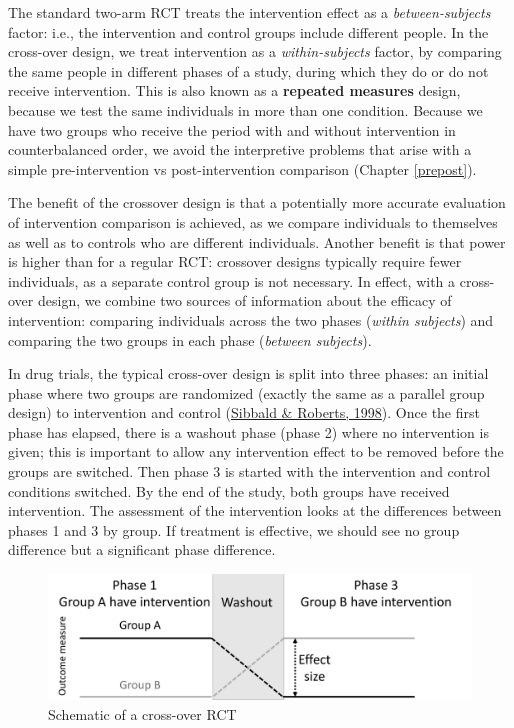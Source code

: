 \documentclass{krantz}
\begin{document}
The standard two-arm RCT treats the intervention effect as a \emph{between-subjects} factor: i.e., the intervention and control groups include different people. In the cross-over design, we treat intervention as a \emph{within-subjects} factor, by comparing the same people in different phases of a study, during which they do or do not receive intervention. This is also known as a \textbf{repeated measures} design, because we test the same individuals in more than one condition. Because we have two groups who receive the period with and without intervention in counterbalanced order, we avoid the interpretive problems that arise with a simple pre-intervention vs post-intervention comparison (Chapter \ref{prepost}).

The benefit of the crossover design is that a potentially more accurate evaluation of intervention comparison is achieved, as we compare individuals to themselves as well as to controls who are different individuals. Another benefit is that power is higher than for a regular RCT: crossover designs typically require fewer individuals, as a separate control group is not necessary. In effect, with a cross-over design, we combine two sources of information about the efficacy of intervention: comparing individuals across the two phases (\emph{within subjects}) and comparing the two groups in each phase (\emph{between subjects}).

In drug trials, the typical cross-over design is split into three phases: an initial phase where two groups are randomized (exactly the same as a parallel group design) to intervention and control (\protect\hyperlink{ref-sibbald1998}{Sibbald \& Roberts, 1998}). Once the first phase has elapsed, there is a washout phase (phase 2) where no intervention is given; this is important to allow any intervention effect to be removed before the groups are switched. Then phase 3 is started with the intervention and control conditions switched. By the end of the study, both groups have received intervention. The assessment of the intervention looks at the differences between phases 1 and 3 by group. If treatment is effective, we should see no group difference but a significant phase difference.

\begin{figure}
\includegraphics[width=0.85\linewidth]{images_bw/crossover} \caption{Schematic of a cross-over RCT}\label{fig:crossoverplot}
\end{figure}
\end{document}

